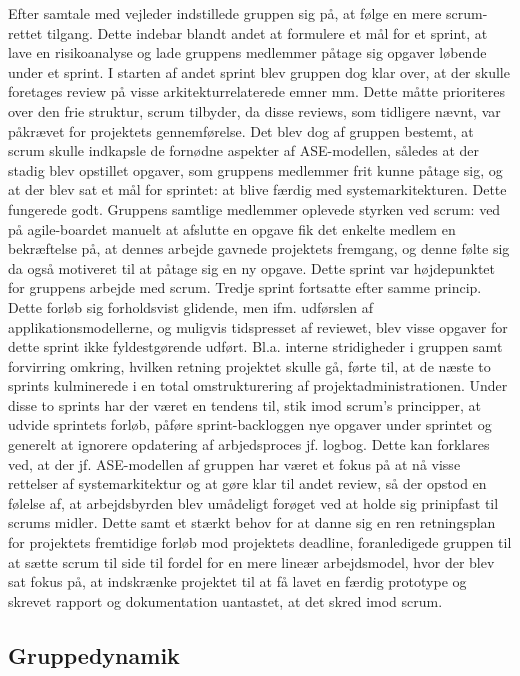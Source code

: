 Efter samtale med vejleder indstillede gruppen sig på, at følge en mere scrum-rettet tilgang. Dette indebar blandt andet at formulere et mål for et sprint,
at lave en risikoanalyse og lade gruppens medlemmer påtage sig opgaver løbende under et sprint. I starten af andet sprint blev gruppen dog klar over, at der
skulle foretages review på visse arkitekturrelaterede emner mm. Dette måtte prioriteres over den frie struktur, scrum tilbyder, da disse reviews, som tidligere
nævnt, var påkrævet for projektets gennemførelse. Det blev dog af gruppen bestemt, at scrum skulle indkapsle de fornødne aspekter af ASE-modellen, således at
der stadig blev opstillet opgaver, som gruppens medlemmer frit kunne påtage sig, og at der blev sat et mål for sprintet: at blive færdig med systemarkitekturen.
Dette fungerede godt. Gruppens samtlige medlemmer oplevede styrken ved scrum: ved på agile-boardet manuelt at afslutte en opgave fik det enkelte medlem
en bekræftelse på, at dennes arbejde gavnede projektets fremgang, og denne følte sig da også motiveret til at påtage sig en ny opgave. Dette sprint var højdepunktet
for gruppens arbejde med scrum. Tredje sprint fortsatte efter samme princip. Dette forløb sig forholdsvist glidende, men ifm. udførslen af applikationsmodellerne,
og muligvis tidspresset af reviewet, blev visse opgaver for dette sprint ikke fyldestgørende udført. Bl.a. interne stridigheder i gruppen samt forvirring omkring,
hvilken retning projektet skulle gå, førte til, at de næste to sprints kulminerede i en total omstrukturering af projektadministrationen. Under disse to sprints
har der været en tendens til, stik imod scrum's principper, at udvide sprintets forløb, påføre sprint-backloggen nye opgaver under sprintet og generelt at ignorere
opdatering af arbjedsproces jf. logbog. Dette kan forklares ved, at der jf. ASE-modellen af gruppen har været et fokus på at nå visse rettelser af systemarkitektur
og at gøre klar til andet review, så der opstod en følelse af, at arbejdsbyrden blev umådeligt forøget ved at holde sig prinipfast til scrums midler. Dette samt
et stærkt behov for at danne sig en ren retningsplan for projektets fremtidige forløb mod projektets deadline, foranledigede gruppen til at sætte scrum til side
til fordel for en mere lineær arbejdsmodel, hvor der blev sat fokus på, at indskrænke projektet til at få lavet en færdig prototype og skrevet rapport og
dokumentation uantastet, at det skred imod scrum.


\subsection{Gruppedynamik}
